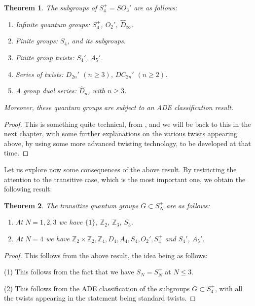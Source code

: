 \documentclass[12pt]{amsbook}
\newtheorem{theorem}{Theorem}[chapter]
\begin{document}
\begin{theorem}
The subgroups of $S_4^+=SO_3'$ are as follows:
\begin{enumerate}
\item Infinite quantum groups: $S_4^+$, $O_2'$, $\widehat{D}_\infty$.

\item Finite groups: $S_4$, and its subgroups.

\item Finite group twists: $S_4'$, $A_5'$.

\item Series of twists: $D_{2n}'$ $(n\geq 3)$, $DC_{2n}'$ $(n\geq 2)$.

\item A group dual series: $\widehat{D}_n$, with $n\geq 3$.
\end{enumerate}
Moreover, these quantum groups are subject to an ADE classification result.
\end{theorem}

\begin{proof}
This is something quite technical, from \cite{bb1}, and we will be back to this in the next chapter, with some further explanations on the various twists appearing above, by using some more advanced twisting technology, to be developed at that time.
\end{proof}

Let us explore now some consequences of the above result. By restricting the attention to the transitive case, which is the most important one, we obtain the following result:

\begin{theorem}
The transitive quantum groups $G\subset S_N^+$ are as follows:
\begin{enumerate}
\item At $N=1,2,3$ we have $\{1\}$, $\mathbb Z_2$, $\mathbb Z_3$, $S_3$.

\item At $N=4$ we have $\mathbb Z_2\times\mathbb Z_2,\mathbb Z_4,D_4,A_4,S_4,O_2',S_4^+$ and $S_4'$, $A_5'$.
\end{enumerate}
\end{theorem}

\begin{proof}
This follows from the above result, the idea being as follows:

\medskip

(1) This follows from the fact that we have $S_N=S_N^+$ at $N\leq3$.

\medskip

(2) This follows from the ADE classification of the subgroups $G\subset S_4^+$, with all the twists appearing in the statement being standard twists.
\end{proof}
\end{document}
